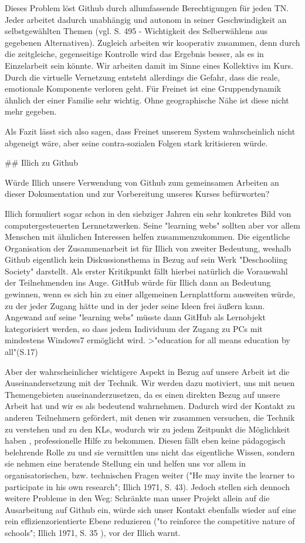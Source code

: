 Dieses Problem löst Github durch allumfassende Berechtigungen für jeden TN.
Jeder arbeitet dadurch unabhängig und autonom in seiner Geschwindigkeit an selbstgewählten Themen (vgl. S. 495 - Wichtigkeit des Selberwählens aus gegebenen Alternativen).
Zugleich arbeiten wir kooperativ zusammen, denn durch die zeitgleiche, gegenseitige Kontrolle  wird das Ergebnis besser, als es in Einzelarbeit sein könnte.
Wir arbeiten damit im Sinne eines Kollektivs im Kurs.
Durch die virtuelle Vernetzung entsteht allerdings die Gefahr, dass die reale, emotionale Komponente verloren geht.
Für Freinet ist eine Gruppendynamik ähnlich der einer Familie sehr wichtig.
Ohne geographische Nähe ist diese nicht mehr gegeben.

Als Fazit lässt sich also sagen, dass Freinet unserem System wahrscheinlich nicht abgeneigt wäre, aber seine contra-sozialen Folgen stark kritisieren würde.


## Illich zu Github

Würde Illich unsere Verwendung von Github zum gemeinsamen Arbeiten an dieser Dokumentation und zur Vorbereitung unseres Kurses befürworten?

Illich formuliert sogar schon in den siebziger Jahren ein sehr konkretes Bild von computergesteuerten Lernnetzwerken.
Seine "learning webs" sollten aber vor allem Menschen mit ähnlichen Interessen helfen zusammenzukommen.
Die eigentliche Organisation der Zusammenarbeit ist für Illich von zweiter Bedeutung, weshalb Github eigentlich kein Diskussionsthema in Bezug auf sein Werk "Deschooliing Society" darstellt.
Als erster Kritikpunkt fällt hierbei natürlich die Vorauswahl der Teilnehmenden ins Auge.
GitHub würde für Illich dann an Bedeutung gewinnen, wenn es sich hin zu einer allgemeinen Lernplattform ausweiten würde, zu der jeder Zugang hätte und in der jeder seine Ideen frei äußern kann.
Angewand auf seine "learning webs" müsste dann GitHub als Lernobjekt kategorisiert werden, so dass jedem Individuum der Zugang zu PCs mit mindestens Windows7 ermöglicht wird.
>"education for all means education by all"(S.17)

Aber der wahrscheinlicher wichtigere Aspekt in Bezug auf unsere Arbeit ist die Auseinandersetzung mit der Technik.
Wir werden dazu motiviert, uns mit neuen Themengebieten auseinanderzusetzen, da es einen direkten Bezug auf unsere Arbeit hat und wir es als bedeutend wahrnehmen.
Dadurch wird der Kontakt zu anderen Teilnehmern gefördert, mit denen wir zusammen versuchen, die Technik zu verstehen und zu den KLs, wodurch wir zu jedem Zeitpunkt die Möglichkeit haben , professionelle Hilfe zu bekommen. Diesen fällt eben keine pädagogisch belehrende Rolle zu und sie vermittlen uns nicht das eigentliche Wissen,
sondern sie nehmen eine beratende Stellung ein und helfen uns vor allem in organisatorischen, bzw. technischen Fragen weiter ("He may invite the learner to participate in his own research"; Illich 1971, S. 43).
Jedoch stellen sich dennoch weitere Probleme in den Weg:
Schränkte man unser Projekt allein auf die Ausarbeitung auf Github ein, würde sich unser Kontakt ebenfalls wieder auf eine rein effizienzorientierte Ebene reduzieren ("to reinforce the competitive nature of schools"; Illich 1971, S. 35 ), vor der Illich warnt.

